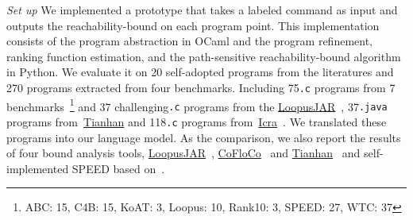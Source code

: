 \emph{Set up} We implemented a prototype {\THESYSTEM} that takes a labeled command as input 
and outputs the reachability-bound on each program point.
This implementation consists of the 
program abstraction in OCaml and the program refinement, ranking function estimation, and the path-sensitive reachability-bound algorithm in Python.
We evaluate it on 20 self-adopted programs from the literatures and 270 programs extracted from four benchmarks. 
Including 75{\tt .c} programs from 7 benchmarks~\cite{BenchmarkLoops}\footnote{ABC: 15, C4B: 15, KoAT: 3, Loopus: 10, Rank10: 3, SPEED: 27, WTC: 37} and 37 challenging{\tt .c} programs 
from the \hyperlink{https://forsyte.at/static/people/sinn/loopusJAR/index.html}{LoopusJAR}~\cite{BenchmarkLoops,SinnZV17},
37{\tt .java} programs from~\hyperlink{https://zenodo.org/record/5140586\#.Y5pBoC-B1QI}{Tianhan}\cite{BenchmarkTianhan,LuCT21}
and 118{\tt .c} programs from~\hyperlink{https://github.com/icra-team/icra}{Icra}~\cite{BenchmarkIcra,KincaidBCR19,CyphertBKR19}.
We translated these programs into our language model.
As the comparison, we also report the results of four bound analysis tools, 
\hyperlink{https://forsyte.at/software/loopus/}{LoopusJAR}~\cite{SinnZV17},
\hyperlink{https://github.com/aeflores/CoFloCo/tree/master/src}{CoFloCo}~\cite{ToolCofloco,Montoya17,Flores-Montoya16,Flores-MontoyaH14}
and \hyperlink{https://zenodo.org/record/5140586\#.Y5pBoC-B1QI}{Tianhan}~\cite{BenchmarkTianhan}
and self-implemented SPEED based on~\cite{GulwaniJK09}.

